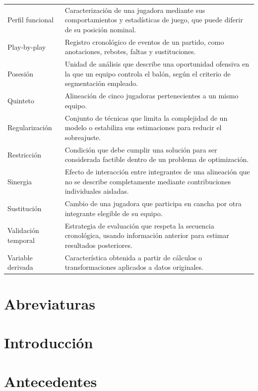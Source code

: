 \documentclass[12pt,letterpaper]{report}
\begin{document}
\begin{longtable}{@{}p{4cm}p{10cm}@{}}
Perfil funcional & Caracterización de una jugadora mediante sus comportamientos y estadísticas de juego, que puede diferir de su posición nominal. \\
Play-by-play & Registro cronológico de eventos de un partido, como anotaciones, rebotes, faltas y sustituciones. \\
Posesión & Unidad de análisis que describe una oportunidad ofensiva en la que un equipo controla el balón, según el criterio de segmentación empleado. \\
Quinteto & Alineación de cinco jugadoras pertenecientes a un mismo equipo. \\
Regularización & Conjunto de técnicas que limita la complejidad de un modelo o estabiliza sus estimaciones para reducir el sobreajuste. \\
Restricción & Condición que debe cumplir una solución para ser considerada factible dentro de un problema de optimización. \\
Sinergia & Efecto de interacción entre integrantes de una alineación que no se describe completamente mediante contribuciones individuales aisladas. \\
Sustitución & Cambio de una jugadora que participa en cancha por otra integrante elegible de su equipo. \\
Validación temporal & Estrategia de evaluación que respeta la secuencia cronológica, usando información anterior para estimar resultados posteriores. \\
Variable derivada & Característica obtenida a partir de cálculos o transformaciones aplicados a datos originales. \\
\bottomrule
\end{longtable}

\chapter*{Abreviaturas}


\chapter*{Introducción}


\chapter{Antecedentes}
\end{document}
